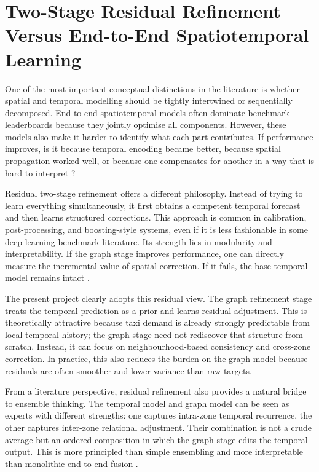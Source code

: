 \documentclass[12pt,a4paper]{report}
\begin{document}
\section{Two-Stage Residual Refinement Versus End-to-End Spatiotemporal Learning}

One of the most important conceptual distinctions in the literature is whether spatial and temporal modelling should be tightly intertwined or sequentially decomposed. End-to-end spatiotemporal models often dominate benchmark leaderboards because they jointly optimise all components. However, these models also make it harder to identify what each part contributes. If performance improves, is it because temporal encoding became better, because spatial propagation worked well, or because one compensates for another in a way that is hard to interpret \cite{jiang2022survey,garcia2023explainability}?

Residual two-stage refinement offers a different philosophy. Instead of trying to learn everything simultaneously, it first obtains a competent temporal forecast and then learns structured corrections. This approach is common in calibration, post-processing, and boosting-style systems, even if it is less fashionable in some deep-learning benchmark literature. Its strength lies in modularity and interpretability. If the graph stage improves performance, one can directly measure the incremental value of spatial correction. If it fails, the base temporal model remains intact \cite{shao2022d2stgnn}.

The present project clearly adopts this residual view. The graph refinement stage treats the temporal prediction as a prior and learns residual adjustment. This is theoretically attractive because taxi demand is already strongly predictable from local temporal history; the graph stage need not rediscover that structure from scratch. Instead, it can focus on neighbourhood-based consistency and cross-zone correction. In practice, this also reduces the burden on the graph model because residuals are often smoother and lower-variance than raw targets.

From a literature perspective, residual refinement also provides a natural bridge to ensemble thinking. The temporal model and graph model can be seen as experts with different strengths: one captures intra-zone temporal recurrence, the other captures inter-zone relational adjustment. Their combination is not a crude average but an ordered composition in which the graph stage edits the temporal output. This is more principled than simple ensembling and more interpretable than monolithic end-to-end fusion \cite{garcia2023explainability,shao2022d2stgnn}.
\end{document}
